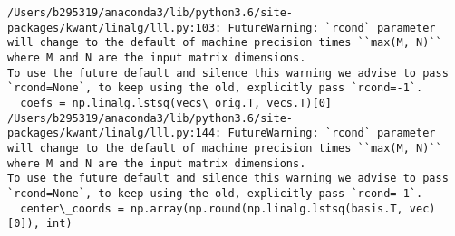\documentclass[11pt]{article}
\begin{document}
    \begin{Verbatim}[commandchars=\\\{\}]
/Users/b295319/anaconda3/lib/python3.6/site-packages/kwant/linalg/lll.py:103: FutureWarning: `rcond` parameter will change to the default of machine precision times ``max(M, N)`` where M and N are the input matrix dimensions.
To use the future default and silence this warning we advise to pass `rcond=None`, to keep using the old, explicitly pass `rcond=-1`.
  coefs = np.linalg.lstsq(vecs\_orig.T, vecs.T)[0]
/Users/b295319/anaconda3/lib/python3.6/site-packages/kwant/linalg/lll.py:144: FutureWarning: `rcond` parameter will change to the default of machine precision times ``max(M, N)`` where M and N are the input matrix dimensions.
To use the future default and silence this warning we advise to pass `rcond=None`, to keep using the old, explicitly pass `rcond=-1`.
  center\_coords = np.array(np.round(np.linalg.lstsq(basis.T, vec)[0]), int)

    \end{Verbatim}

    \begin{center}
    \end{center}
    { \hspace*{\fill} \\}
    
\end{document}
